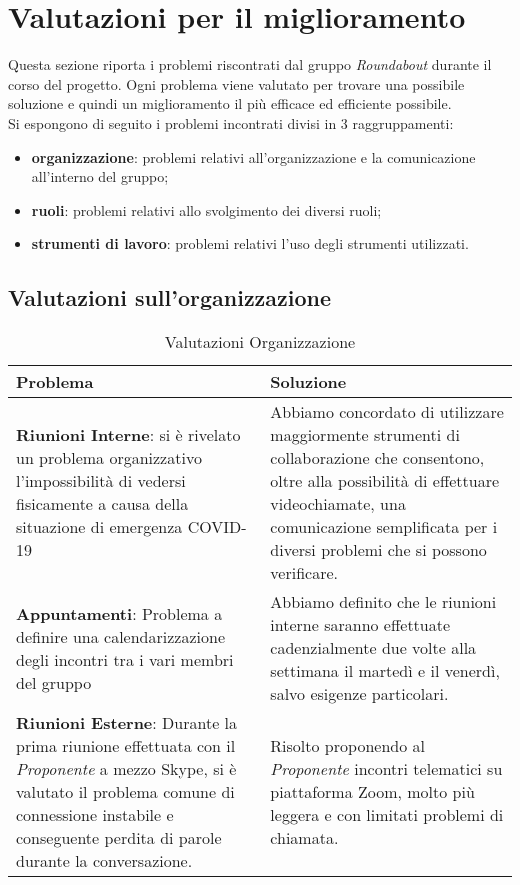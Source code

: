 \section{Valutazioni per il miglioramento}
	Questa sezione riporta i problemi riscontrati dal gruppo \textit{Roundabout} durante il corso del progetto. Ogni problema viene valutato per trovare una possibile soluzione e quindi un miglioramento il più efficace ed efficiente possibile. \\
	Si espongono di seguito i problemi incontrati divisi in 3 raggruppamenti:
	\begin{itemize}
		\item \textbf{organizzazione}: problemi relativi all’organizzazione e la comunicazione all’interno del gruppo;
		\item \textbf{ruoli}: problemi relativi allo svolgimento dei diversi ruoli;
		\item \textbf{strumenti di lavoro}: problemi relativi l’uso degli strumenti utilizzati.
	\end{itemize}

\subsection{Valutazioni sull'organizzazione}
	\begin{longtable}{ 
		>{\centering}p{} 
		>{\centering\arraybackslash}p{}}
	
		\caption {Valutazioni Organizzazione}		\\
		
		\textbf{\color{white}Problema} &
		\textbf{\color{white}Soluzione}
		\tabularnewline  
		\endhead
		
		\textbf{Riunioni Interne}: si è rivelato un problema organizzativo l'impossibilità di vedersi fisicamente a causa della situazione di emergenza COVID-19\ped{\textit{G}} & Abbiamo concordato di utilizzare maggiormente strumenti di collaborazione che consentono, oltre alla possibilità di effettuare videochiamate, una comunicazione semplificata per i diversi problemi che si possono verificare. \\
		
		\textbf{Appuntamenti}: Problema a definire una calendarizzazione degli incontri tra i vari membri del gruppo & Abbiamo definito che le riunioni interne saranno effettuate cadenzialmente due volte alla settimana il martedì e il venerdì, salvo esigenze particolari.\\
		
		\textbf{Riunioni Esterne}: Durante la prima riunione effettuata con il \textit{Proponente}\ped{\textit{G}} a mezzo Skype\ped{\textit{G}}, si è valutato il problema comune di connessione instabile e conseguente perdita di parole durante la conversazione. & Risolto proponendo al \textit{Proponente}\ped{\textit{G}}	incontri telematici su piattaforma Zoom\ped{\textit{G}}, molto più leggera e con limitati problemi di chiamata.\\
				
		\end{longtable}

